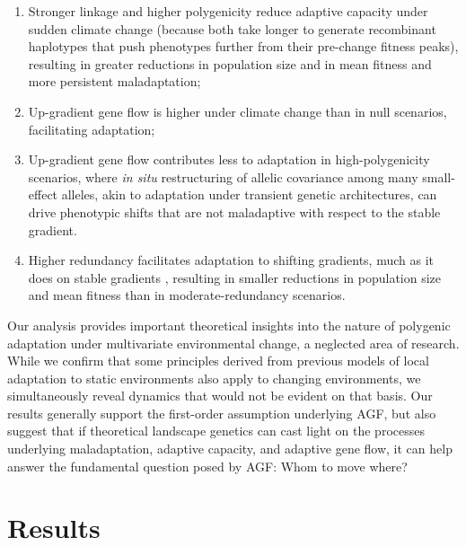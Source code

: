 \documentclass[9pt,twocolumn,twoside,lineno]{pnas-new}
\begin{document}
\begin{enumerate}
    \item Stronger linkage and higher polygenicity reduce adaptive capacity under sudden climate change (because both take longer to generate recombinant haplotypes that push phenotypes further from their pre-change fitness peaks), resulting in greater reductions in population size and in mean fitness and more persistent maladaptation;
    \item Up-gradient gene flow is higher under climate change than in null scenarios, facilitating adaptation;
    \item Up-gradient gene flow contributes less to adaptation in high-polygenicity scenarios, where \textit{in situ} restructuring of allelic covariance among many small-effect alleles, akin to adaptation under transient genetic architectures, can drive phenotypic shifts that are not maladaptive with respect to the stable gradient.
    \item Higher redundancy facilitates adaptation to shifting gradients, much as it does on stable gradients \cite{barghi_redundancy,manceau,yeaman_amnat}, resulting in smaller reductions in population size and mean fitness than in moderate-redundancy scenarios.
\end{enumerate}

Our analysis provides important theoretical insights
into the nature of polygenic adaptation under multivariate environmental change,
a neglected area of research.
While we confirm that some principles derived from previous models of local adaptation to static environments
also apply to changing environments, we simultaneously
reveal dynamics that would not be evident on that basis.
Our results generally support the first-order assumption underlying AGF,
but also suggest that if theoretical landscape genetics can cast 
light on the processes underlying maladaptation, adaptive capacity, and adaptive gene
flow, it can help answer the fundamental question posed by AGF: Whom to move where?


\section*{Results}
\end{document}
